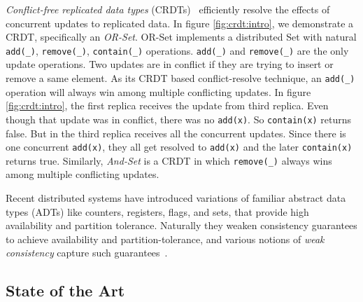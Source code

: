 \emph{Conflict-free replicated data types} (CRDTs)~\cite{DBLP:conf/sss/ShapiroPBZ11} efficiently resolve the effects of concurrent updates to replicated data. In figure \ref{fig:crdt:intro}, we demonstrate a CRDT, specifically an \emph{OR-Set}.
OR-Set implements a distributed Set with natural \texttt{add(\_)}, \texttt{remove(\_)}, \texttt{contain(\_)} operations. \texttt{add(\_)} and \texttt{remove(\_)} are the only update operations. Two updates are in conflict if they are trying to insert or remove a same element. As its CRDT based conflict-resolve technique, an \texttt{add(\_)} operation will always win among multiple conflicting updates. In figure \ref{fig:crdt:intro}, the first replica receives the update from third replica. Even though that update was in conflict, there was no \texttt{add(x)}. So \texttt{contain(x)} returns false. But in the third replica receives all the concurrent updates. Since there is one concurrent \texttt{add(x)}, they all get resolved to \texttt{add(x)} and the later \texttt{contain(x)} returns true. Similarly, \emph{And-Set} is a CRDT in which \texttt{remove(\_)} always wins among multiple conflicting updates.

Recent distributed systems have introduced variations of familiar abstract data types (ADTs) like counters, registers, flags, and sets, that provide high availability and partition tolerance. Naturally they weaken consistency guarantees to achieve availability and partition-tolerance, and various notions of \emph{weak consistency} capture such guarantees~\cite{DBLP:conf/pdis/TerryDPSTW94, DBLP:conf/sosp/TerryTPDSH95, DBLP:conf/popl/MansonPA05, DBLP:journals/ftpl/Burckhardt14, DBLP:conf/popl/BurckhardtGYZ14}.


\subsection{State of the Art}

